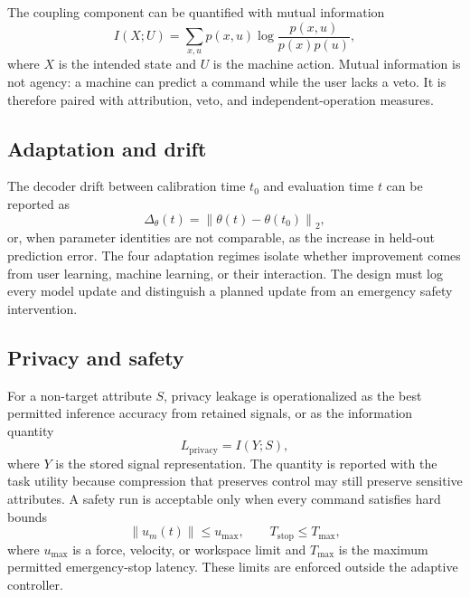 \documentclass[conference]{IEEEtran}
\begin{document}
The coupling component can be quantified with mutual information
\begin{equation}
I(X;U)=\sum_{x,u}p(x,u)\log\frac{p(x,u)}{p(x)p(u)},
\label{eq:mutualinformation}
\end{equation}
where $X$ is the intended state and $U$ is the machine action. Mutual information is not agency: a machine can predict a command while the user lacks a veto. It is therefore paired with attribution, veto, and independent-operation measures.

\subsection{Adaptation and drift}

The decoder drift between calibration time $t_0$ and evaluation time $t$ can be reported as
\begin{equation}
\Delta_{\theta}(t)=\left\|\theta(t)-\theta(t_0)\right\|_2,
\label{eq:drift}
\end{equation}
or, when parameter identities are not comparable, as the increase in held-out prediction error. The four adaptation regimes isolate whether improvement comes from user learning, machine learning, or their interaction. The design must log every model update and distinguish a planned update from an emergency safety intervention.

\subsection{Privacy and safety}

For a non-target attribute $S$, privacy leakage is operationalized as the best permitted inference accuracy from retained signals, or as the information quantity
\begin{equation}
L_{\mathrm{privacy}}=I(Y;S),
\label{eq:privacy}
\end{equation}
where $Y$ is the stored signal representation. The quantity is reported with the task utility because compression that preserves control may still preserve sensitive attributes. A safety run is acceptable only when every command satisfies hard bounds
\begin{equation}
\left\|u_m(t)\right\|\leq u_{\max},\qquad T_{\mathrm{stop}}\leq T_{\max},
\label{eq:safety}
\end{equation}
where $u_{\max}$ is a force, velocity, or workspace limit and $T_{\max}$ is the maximum permitted emergency-stop latency. These limits are enforced outside the adaptive controller.
\end{document}
